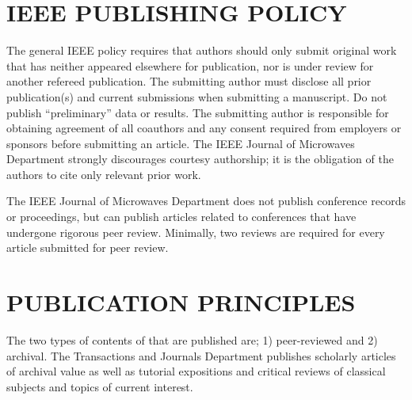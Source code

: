 \documentclass{IEEEjmw}
\begin{document}
\section{IEEE PUBLISHING POLICY}

The general IEEE policy requires that authors should only submit original work that has neither appeared elsewhere for publication, nor is under review for another refereed publication. The submitting author must disclose all prior publication(s) and current submissions when submitting a manuscript. Do not publish ``preliminary'' data or results. The submitting author is responsible for obtaining agreement of all coauthors and any consent required from employers or sponsors before submitting an article. The IEEE Journal of Microwaves Department strongly discourages courtesy authorship; it is the obligation of the authors to cite only relevant prior work.

The IEEE Journal of Microwaves Department does not publish conference records or proceedings, but can publish articles related to conferences that have undergone rigorous peer review. Minimally, two reviews are required for every article submitted for peer review.

\section{PUBLICATION PRINCIPLES}

The two types of contents of that are published are; 1) peer-reviewed and 2) archival. The Transactions and Journals Department publishes scholarly articles of archival value as well as tutorial expositions and critical reviews of classical subjects and topics of current interest. 
\end{document}
